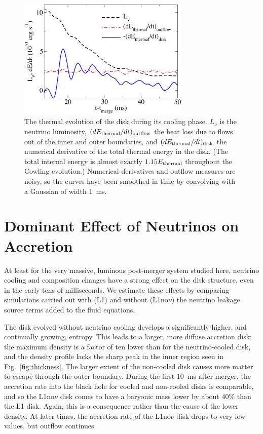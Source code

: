 \begin{figure}
\includegraphics[width=8.2cm]{Figures/thermal_evolution}
\caption[Analysis of the thermal evolution of the disk]{
The thermal evolution of the disk during its cooling phase. 
$L_{\nu}$ is the neutrino luminosity, $(dE_{\rm thermal}/dt)_{\rm outflow}$
the heat loss due to flows out of the inner and outer boundaries,
and $(dE_{\rm thermal}/dt)_{\rm disk}$ the numerical derivative of the
total thermal energy in the disk.  (The total internal energy
is almost exactly $1.15E_{\rm thermal}$ throughout the Cowling evolution.) 
Numerical derivatives and
outflow measures are noisy, so the curves have been smoothed in
time by convolving with a Gaussian of width 1~ms.
}
\label{fig:cooling}
\end{figure}

\section{Dominant Effect of Neutrinos on Accretion}
\label{sec:comparison}

At least for the very massive, luminous post-merger system studied
here, neutrino cooling and composition changes have a strong effect
on the disk structure, even in the early tens of milliseconds.  We
estimate these effects by comparing simulations carried out with (L1) and
without (L1no$\nu$) the neutrino leakage source terms added to the fluid
equations.

The disk evolved without neutrino cooling develops a significantly
higher, and continually growing, entropy.  This leads to a larger,
more diffuse accretion disk; the maximum density is a factor of ten lower
than for the neutrino-cooled disk, and the density profile lacks the
sharp peak in the inner region seen in Fig.~\ref{fig:thickness}. 
The larger extent of the non-cooled disk causes more matter to escape
through the outer boundary.  During the first 10~ms after merger, the
accretion rate into the black hole for cooled and non-cooled disks is
comparable, and so the L1no$\nu$ disk comes to have a baryonic mass lower by
about 40\% than the L1 disk.  Again, this is a consequence rather than
the cause of the lower density.  At later times, the accretion rate
of the L1no$\nu$ disk drops to very low values, but outflow continues. 

